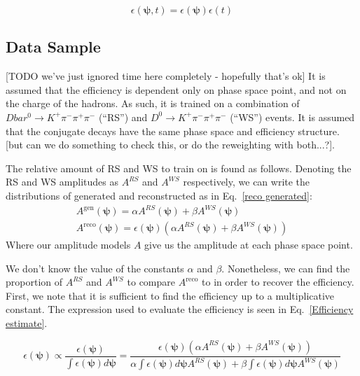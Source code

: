 \documentclass[note.tex]{subfiles}
\begin{document}
\begin{equation}
    \epsilon(\mathbf{\psi}, t) = \epsilon(\mathbf{\psi}) \epsilon(t)
    \label{efficiency split}
\end{equation}

\subsection{Data Sample}
[TODO we've just ignored time here completely - hopefully that's ok]
It is assumed that the efficiency is dependent only on phase space point, and not on the charge of the hadrons.
As such, it is trained on a combination of $Dbar^0 \rightarrow K^+ \pi^- \pi^+ \pi^-$ (``RS'') and $D^0 \rightarrow K^+ \pi^- \pi^+ \pi^-$ (``WS'') events.
It is assumed that the conjugate decays have the same phase space and efficiency structure. [but can we do something to check this, or do the reweighting with both...?].

The relative amount of RS and WS to train on is found as follows.
Denoting the RS and WS amplitudes as $A^{RS}$ and $A^{WS}$ respectively, we can write the distributions of generated and reconstructed as in Eq.~\ref{reco generated}:
\begin{equation}
    \begin{aligned}
        A^{\mathrm{gen}}(\mathbf{\psi}) = \alpha A^{RS}(\mathbf{\psi}) + \beta A^{WS}(\mathbf{\psi})\quad \\
        A^{\mathrm{reco}}(\mathbf{\psi}) = \epsilon(\mathbf{\psi})(\alpha A^{RS}(\mathbf{\psi}) + \beta A^{WS}(\mathbf{\psi}))
    \end{aligned}
    \label{reco generated}
\end{equation}
Where our amplitude models $A$ give us the amplitude at each phase space point.

We don't know the value of the constants $\alpha$ and $\beta$.
Nonetheless, we can find the proportion of $A^{RS}$ and $A^{WS}$ to compare $A^\mathrm{reco}$ to in order to recover the efficiency.
First, we note that it is sufficient to find the efficiency up to a multiplicative constant.
The expression used to evaluate the efficiency is seen in Eq.~\ref{Efficiency estimate}.

\begin{equation}
    \epsilon(\mathbf{\psi}) \propto \frac{\epsilon(\mathbf{\psi})}{\int \epsilon(\mathbf{\psi}) d\mathbf{\psi}} = \frac{\epsilon(\mathbf{\psi})(\alpha A^{RS}(\mathbf{\psi}) + \beta A^{WS}(\mathbf{\psi}))}{\alpha \int \epsilon(\mathbf{\psi}) d\mathbf{\psi}A^{RS}(\mathbf{\psi}) + \beta \int \epsilon(\mathbf{\psi}) d\mathbf{\psi}A^{WS}(\mathbf{\psi})}
    \label{Efficiency estimate}
\end{equation}
\end{document}
